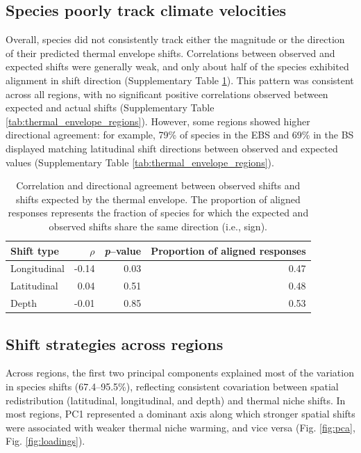 \documentclass[11pt]{article}
\begin{document}
\begin{spacing}{1.5}
\subsection{Species poorly track climate velocities}

Overall, species did not consistently track either the magnitude or the direction of their predicted thermal envelope shifts. Correlations between observed and expected shifts were generally weak, and only about half of the species exhibited alignment in shift direction (Supplementary Table \ref{tab:thermal_envelope}). This pattern was consistent across all regions, with no significant positive correlations observed between expected and actual shifts (Supplementary Table \ref{tab:thermal_envelope_regions}). However, some regions showed higher directional agreement: for example, 79\% of species in the EBS and 69\% in the BS displayed matching latitudinal shift directions between observed and expected values (Supplementary Table \ref{tab:thermal_envelope_regions}).


\begin{table}[ht]
\caption{Correlation and directional agreement between observed shifts and shifts expected by the thermal envelope. The proportion of aligned responses represents the fraction of species for which the expected and observed shifts share the same direction (i.e., sign).}
\centering
\label{tab:thermal_envelope}
\begin{tabular}[t]{l|r|r|r}
\hline
Shift type & $\rho$ & \textit{p}--value & Proportion of aligned responses \\
\hline
Longitudinal & -0.14 & 0.03 & 0.47 \\
\hline
Latitudinal & 0.04 & 0.51 & 0.48 \\
\hline
Depth & -0.01 & 0.85 & 0.53 \\
\hline
\end{tabular}
\end{table}

\subsection{Shift strategies across regions}

Across regions, the first two principal components explained most of the variation in species shifts (67.4–95.5\%), reflecting consistent covariation between spatial redistribution (latitudinal, longitudinal, and depth) and thermal niche shifts. In most regions, PC1 represented a dominant axis along which stronger spatial shifts were associated with weaker thermal niche warming, and vice versa (Fig. \ref{fig:pca}, Fig. \ref{fig:loadings}).


\end{spacing}
\end{document}
